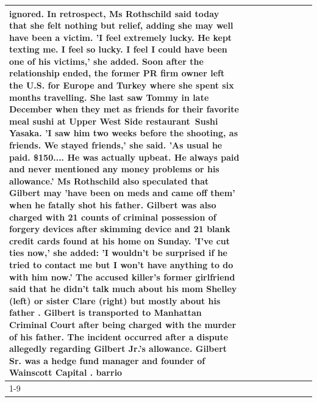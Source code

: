 \begin{table}[H]
\begin{tabular}{lllrlllll}
ignored. In retrospect, Ms Rothschild said today that she felt nothing but relief, adding she may well have been a victim. 'I feel extremely lucky. He kept texting me. I feel so lucky. I feel I could have been one of his victims,' she added. Soon after the relationship ended, the former PR firm owner left the U.S. for Europe and Turkey where she spent six months  travelling. She last saw Tommy in late December when they met as friends for their favorite meal sushi at Upper West Side restaurant Sushi Yasaka. 'I saw him two weeks before the shooting, as friends. We stayed friends,' she said. 'As usual he paid. \$150.... He was actually upbeat. He always paid and never mentioned any money problems or his allowance.' Ms Rothschild also speculated that Gilbert may 'have been on meds and came off them' when he fatally shot his father. Gilbert was also charged with 21 counts of criminal possession of forgery devices after skimming device and 21 blank credit cards found at his home on Sunday. 'I've cut ties now,' she added: 'I wouldn’t be surprised if he tried to contact me but I won’t have anything to do with him now.' The accused killer's former girlfriend said that he didn't talk much about his mom Shelley (left) or sister Clare (right) but mostly about his father . Gilbert is transported to Manhattan Criminal Court  after being charged with the murder of his father. The incident occurred after a dispute allegedly regarding Gilbert Jr.'s allowance. Gilbert Sr. was a hedge fund manager and founder of Wainscott Capital . barrio \\
\cline{1-9} \cline{2-9}

\end{tabular}
\end{table}
